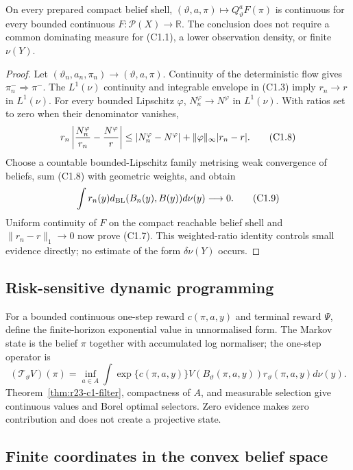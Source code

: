 \begin{theorem}
\label{thm:r23-c1-filter}
On every prepared compact belief shell, $(\vartheta,a,\pi)\mapsto
Q_\vartheta^aF(\pi)$ is continuous for every bounded continuous
$F:\mathcal P(X)\to\mathbb R$.  The conclusion does not require a common
dominating measure for (C1.1), a lower observation density, or finite
$\nu(Y)$.
\end{theorem}

\begin{proof}
Let $(\vartheta_n,a_n,\pi_n)\to(\vartheta,a,\pi)$.  Continuity of the
deterministic flow gives $\pi_n^-\Rightarrow\pi^-$.  The $L^1(\nu)$
continuity and integrable envelope in (C1.3) imply
$r_n\to r$ in $L^1(\nu)$.  For every bounded Lipschitz $\varphi$,
$N_n^\varphi\to N^\varphi$ in $L^1(\nu)$.  With ratios set to zero when their
denominator vanishes,
\[
 r_n\left|{N_n^\varphi\over r_n}-{N^\varphi\over r}\right|
 \le |N_n^\varphi-N^\varphi|+\|\varphi\|_\infty|r_n-r|. \tag{C1.8}
\]
Choose a countable bounded-Lipschitz family metrising weak convergence of
beliefs, sum (C1.8) with geometric weights, and obtain
\[
 \int r_n(y)d_{\rm BL}(B_n(y),B(y))d\nu(y)\longrightarrow0.             \tag{C1.9}
\]
Uniform continuity of $F$ on the compact reachable belief shell and
$\|r_n-r\|_1\to0$ now prove (C1.7).  This weighted-ratio identity controls
small evidence directly; no estimate of the form $\delta\nu(Y)$ occurs.
\end{proof}

\subsection{Risk-sensitive dynamic programming}

For a bounded continuous one-step reward $c(\pi,a,y)$ and terminal reward
$\Psi$, define the finite-horizon exponential value in unnormalised form.  The
Markov state is the belief $\pi$ together with accumulated log normaliser; the
one-step operator is
\[
 (\mathcal T_\vartheta V)(\pi)
 =\inf_{a\in A}\int
 \exp\{c(\pi,a,y)\}V(B_\vartheta(\pi,a,y))
 r_\vartheta(\pi,a,y)d\nu(y).                            \tag{C1.10}
\]
Theorem~\ref{thm:r23-c1-filter}, compactness of $A$, and measurable selection
give continuous values and Borel optimal selectors.  Zero evidence makes zero
contribution and does not create a projective state.

\subsection{Finite coordinates in the convex belief space}

